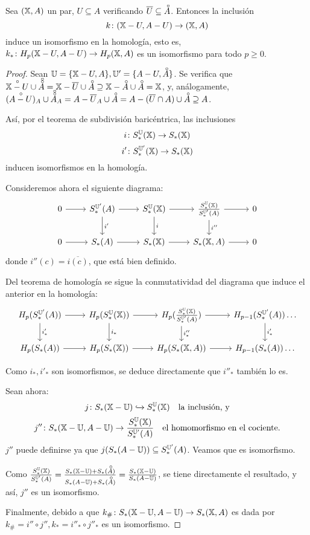 \begin{theorem}
  Sea $({\mathbb X}, A)$ un par, $U \subseteq A$ verificando $\overline{U} \subseteq \interior{A}$. Entonces la inclusión
  \[ k \colon ({\mathbb X} - U, A - U) \to ({\mathbb X}, A) \]
  induce un isomorfismo en la homología, esto es, $k_* \colon H_p({\mathbb X} - U, A - U) \to H_p({\mathbb X}, A)$ es un isomorfismo para todo $p \geq 0$.
\end{theorem}

\begin{proof}
  Sean $\U = \{\X - U, A\}, \U' = \{A - U, \interior{A}\}$. Se verifica que $\interior{\X-U} \cup \interior{\interior{A}} = \X - \overline{U} \cup \interior{A}
  \supseteq \X - \interior{A} \cup \interior{A} = \X$, y, análogamente, $(\interior{A - U})_A \cup \interior{\interior{A}}_A = A - \overline{U}_A \cup \interior{A} =
  A - (\overline{U} \cap A) \cup \interior{A} \supseteq A$.

  Así, por el teorema de subdivisión baricéntrica, las inclusiones
  \[i \colon S_*^{\mathbb U}({\mathbb X}) \to S_*({\mathbb X}) \]
  \[i' \colon S_*^{{\mathbb U}'}({\mathbb X}) \to S_*({\mathbb X}) \]
  inducen isomorfismos en la homología.

  Consideremos ahora el siguiente diagrama:
  \[ \begin{tikzcd}
  0 \arrow{r} & S_*^{\U'}(A) \arrow{r} \arrow{d}{i'} & S_*^{\U}(\X) \arrow{r} \arrow{d}{i} & \frac{S_*^{\U}(\X)}{S_*^{\U'}(A)} \arrow{r} \arrow{d}{i''} & 0 \\
  0 \arrow{r} & S_*(A) \arrow{r} & S_*(\X) \arrow{r} & S_*(\X, A) \arrow{r} & 0
  \end{tikzcd} \]
  donde $i''(c) = \overline{i(c)}$, que está bien definido.

  Del teorema de homología se sigue la conmutatividad del diagrama que induce el anterior en la homología:
  \[ \begin{tikzcd}
  H_p(S_*^{\U'}(A)) \arrow{r} \arrow{d}{i'_*} & H_p(S_*^{\U}(\X)) \arrow{r} \arrow{d}{i_*} & H_p(\frac{S_*^{\U}(\X)}{S_*^{\U'}(A)}) \arrow{r} \arrow{d}{i''_*} & H_{p-1}(S_*^{\U'}(A)) \arrow{d}{i'_*} \dots \\
  H_p(S_*(A)) \arrow{r} & H_p(S_*(\X)) \arrow{r} & H_p(S_*(\X, A)) \arrow{r} & H_{p-1}(S_*(A)) \dots
  \end{tikzcd} \]

  Como $i_*, i'_*$ son isomorfismos, se deduce directamente que $i''_*$ también lo es.

  Sean ahora:
  \[j \colon S_*({\mathbb X} - {\mathbb U}) \xhookrightarrow{}   S_*^{\mathbb U}({\mathbb X}) \quad \text{la inclusión, y} \]
  \[j'' \colon S_*({\mathbb X} - {\mathbb U}, A - {\mathbb U}) \to \frac{S_*^{{\mathbb U}}({\mathbb X})}{S_*^{{\mathbb U}'}(A)} \quad \text{el homomorfismo en el cociente.}\]
  $j''$ puede definirse ya que $j(S_*(A - {\mathbb U})) \subseteq S_*^{{\mathbb U}'}(A)$. Veamos que es isomorfismo.

  Como $\frac{S_*^{\U}(\X)}{S_*^{\U'}(A)} = \frac{S_*(\X - \U) + S_*(\interior{A})}{S_*(A - \U) + S_*(\interior{A})} = \frac{S_*(\X-\U)}{S_*(A-\U)}$, se tiene
  directamente el resultado, y así, $j''$ es un isomorfismo.

  Finalmente, debido a que $k_\# \colon S_*({\mathbb X}-{\mathbb U}, A-{\mathbb U}) \to S_*({\mathbb X}, A)$ es dada por $k_\# = i'' \circ j'', k_* = i''_* \circ j''_*$ es un isomorfismo.
\end{proof}

